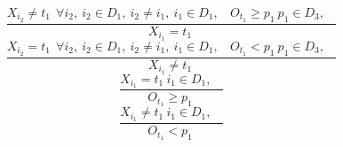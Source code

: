 $$\frac{X_{i_{2}} \neq t_{1}~~\forall i_{2},~i_{2} \in D_{1},~i_{2} \neq i_{1},~i_{1} \in D_{1},~~~~O_{t_{1}} \geq p_{1}~p_{1} \in D_{3},~~~~}{X_{i_{1}}=t_{1}~}$$ $$\frac{X_{i_{2}}=t_{1}~~\forall i_{2},~i_{2} \in D_{1},~i_{2} \neq i_{1},~i_{1} \in D_{1},~~~~O_{t_{1}}<p_{1}~p_{1} \in D_{3},~~~~}{X_{i_{1}} \neq t_{1}~}$$ $$\frac{X_{i_{1}}=t_{1}~i_{1} \in D_{1},~~~~}{O_{t_{1}} \geq p_{1}~}$$ $$\frac{X_{i_{1}} \neq t_{1}~i_{1} \in D_{1},~~~~}{O_{t_{1}}<p_{1}~}$$ 